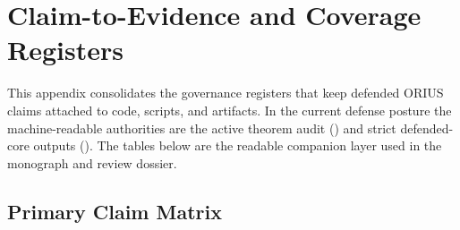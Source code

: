 \chapter{Claim-to-Evidence and Coverage Registers}
\label{app:claim-evidence-registers}

This appendix consolidates the governance registers that keep defended ORIUS
claims attached to code, scripts, and artifacts.  In the current defense posture
the machine-readable authorities are the active theorem audit
() and strict defended-core
outputs ().  The tables below
are the readable companion layer used in the monograph and review dossier.

\section{Primary Claim Matrix}


